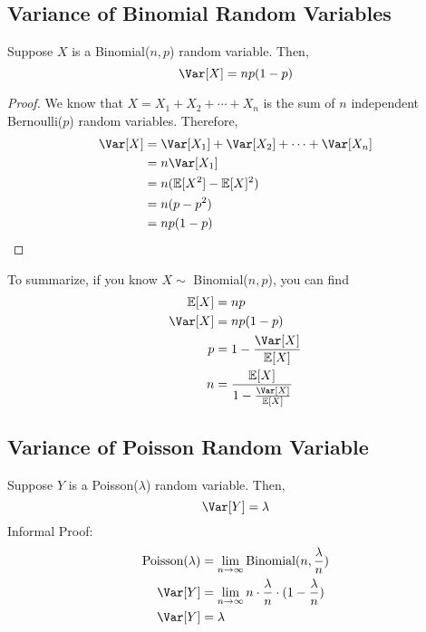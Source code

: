 \subsection{Variance of Binomial Random Variables}
Suppose \(X\) is a Binomial(\(n, p\)) random variable. Then,
\[
    \Var[X] = np(1 - p)
\]
\begin{proof}
    We know that \(X = X_1 + X_2 + \cdots + X_n\) is the sum of \(n\) independent Bernoulli(\(p\)) random variables. Therefore, 
    \[
    \begin{aligned}
        \Var[X] &= \Var[X_1] + \Var[X_2] + \cdots + \Var[X_n] \\
        &= n\Var[X_1] \\
        &= n(\mathbb{E}[X^2] - \mathbb{E}[X]^2) \\
        &= n(p - p^2) \\
        &= np(1 - p)
    \end{aligned}
    \]
\end{proof}

To summarize, if you know \(X \sim\) Binomial(\(n, p\)), you can find
\[
    \begin{aligned}
        \mathbb{E}[X] &= np \\
        \Var[X] &= np(1 - p) \\
        p &= 1- \dfrac{\Var[X]}{\mathbb{E}[X]} \\
        n &= \dfrac{\mathbb{E}[X]}{1- \frac{\Var[X]}{\mathbb{E}[X]}}
    \end{aligned}
\]

\subsection{Variance of Poisson Random Variable}
Suppose \(Y\) is a Poisson(\(\lambda\)) random variable. Then,
\[
    \Var[Y] = \lambda 
\]
Informal Proof: 
\[
    \begin{aligned}
        \text{Poisson}(\lambda) &= \lim_{n \to \infty} \text{Binomial}(n, \dfrac{\lambda}{n}) \\
        \Var[Y] &= \lim_{n \to \infty} n \cdot \dfrac{\lambda}{n} \cdot (1 - \dfrac{\lambda}{n}) \\
        \Var[Y] &= \lambda
    \end{aligned}
\]

